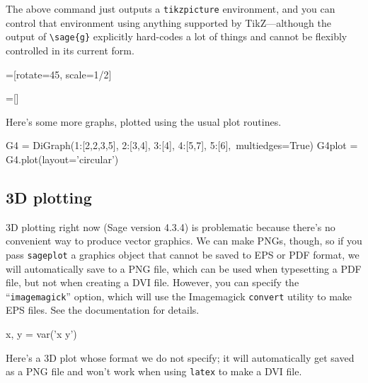 \documentclass{article}
\begin{document}
\begin{center}
\end{center}

The above command just outputs a \texttt{tikzpicture} environment, and
you can control that environment using anything supported by
TikZ---although the output of \verb|\sage{g}| explicitly hard-codes a
lot of things and cannot be flexibly controlled in its current form.

=[rotate=45, scale=1/2]

\begin{center}
\end{center}

=[]

Here's some more graphs, plotted using the usual plot routines.


\begin{sageblock}
G4 = DiGraph({1:[2,2,3,5], 2:[3,4], 3:[4], 4:[5,7], 5:[6]},\
             multiedges=True)
G4plot = G4.plot(layout='circular')
\end{sageblock}


\subsection{3D plotting}

3D plotting right now (Sage version 4.3.4) is problematic because
there's no convenient way to produce vector graphics. We can make PNGs,
though, so if you pass \verb|sageplot| a graphics object that cannot be
saved to EPS or PDF format, we will automatically save to a PNG file,
which can be used when typesetting a PDF file, but not when creating a
DVI file. However, you can specify the ``\texttt{imagemagick}'' option,
which will use the Imagemagick \texttt{convert} utility to make EPS
files. See the documentation for details.


\begin{sagesilent}
  x, y = var('x y')
\end{sagesilent}

Here's a 3D plot whose format we do not specify; it will automatically
get saved as a PNG file and won't work when using \texttt{latex} to make
a DVI file.
\end{document}
